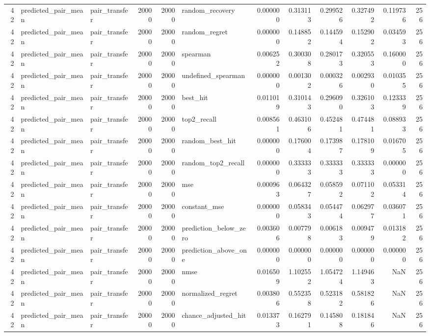 \begin{tabular}{rllrrlrrrrrr}
42 & predicted_pair_mean & pair_transfer & 20000 & 20000 & random_recovery & 0.000000 & 0.313113 & 0.299526 & 0.327492 & 0.119736 & 256 \\
42 & predicted_pair_mean & pair_transfer & 20000 & 20000 & random_regret & 0.000000 & 0.148852 & 0.144594 & 0.152902 & 0.034593 & 256 \\
42 & predicted_pair_mean & pair_transfer & 20000 & 20000 & spearman & 0.006252 & 0.300308 & 0.280173 & 0.320553 & 0.160000 & 256 \\
42 & predicted_pair_mean & pair_transfer & 20000 & 20000 & undefined_spearman & 0.000000 & 0.001302 & 0.000326 & 0.002930 & 0.010355 & 256 \\
42 & predicted_pair_mean & pair_transfer & 20000 & 20000 & best_hit & 0.011019 & 0.310143 & 0.296090 & 0.326103 & 0.123339 & 256 \\
42 & predicted_pair_mean & pair_transfer & 20000 & 20000 & top2_recall & 0.008561 & 0.463106 & 0.452481 & 0.474481 & 0.088933 & 256 \\
42 & predicted_pair_mean & pair_transfer & 20000 & 20000 & random_best_hit & 0.000000 & 0.176004 & 0.173987 & 0.178109 & 0.016705 & 256 \\
42 & predicted_pair_mean & pair_transfer & 20000 & 20000 & random_top2_recall & 0.000000 & 0.333333 & 0.333333 & 0.333333 & 0.000000 & 256 \\
42 & predicted_pair_mean & pair_transfer & 20000 & 20000 & mse & 0.000963 & 0.064327 & 0.058592 & 0.071102 & 0.053314 & 256 \\
42 & predicted_pair_mean & pair_transfer & 20000 & 20000 & constant_mse & 0.000000 & 0.058343 & 0.054474 & 0.062977 & 0.036071 & 256 \\
42 & predicted_pair_mean & pair_transfer & 20000 & 20000 & prediction_below_zero & 0.003606 & 0.007798 & 0.006183 & 0.009479 & 0.013182 & 256 \\
42 & predicted_pair_mean & pair_transfer & 20000 & 20000 & prediction_above_one & 0.000000 & 0.000000 & 0.000000 & 0.000000 & 0.000000 & 256 \\
42 & predicted_pair_mean & pair_transfer & 20000 & 20000 & nmse & 0.016509 & 1.102552 & 1.054724 & 1.149463 & NaN & 256 \\
42 & predicted_pair_mean & pair_transfer & 20000 & 20000 & normalized_regret & 0.003806 & 0.552358 & 0.523182 & 0.581826 & NaN & 256 \\
42 & predicted_pair_mean & pair_transfer & 20000 & 20000 & chance_adjusted_hit & 0.013373 & 0.162791 & 0.145808 & 0.181846 & NaN & 256 \\

\end{tabular}
